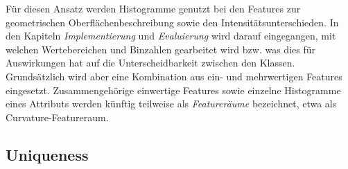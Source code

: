 Für diesen Ansatz werden Histogramme genutzt bei den Features zur geometrischen Oberflächenbeschreibung sowie den Intensitätsunterschieden. In den Kapiteln \textit{Implementierung} und \textit{Evaluierung} wird darauf eingegangen, mit welchen Wertebereichen und Binzahlen gearbeitet wird bzw. was dies für Auswirkungen hat auf die Unterscheidbarkeit zwischen den Klassen. Grundsätzlich wird aber eine Kombination aus ein- und mehrwertigen Features eingesetzt. Zusammengehörige einwertige Features sowie einzelne Histogramme eines Attributs werden künftig teilweise als \textit{Featureräume} bezeichnet, etwa als Curvature-Featureraum.

\subsection{Uniqueness}

